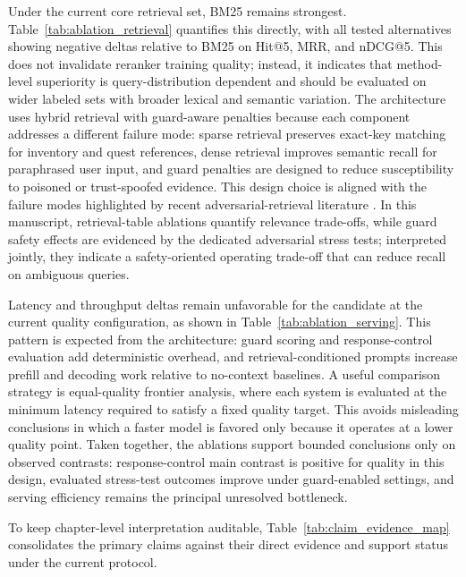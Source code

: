 ﻿\documentclass[a4paper,12pt]{article}
\begin{document}
Under the current core retrieval set, BM25 remains strongest. Table~\ref{tab:ablation_retrieval} quantifies this directly, with all tested alternatives showing negative deltas relative to BM25 on Hit@5, MRR, and nDCG@5. This does not invalidate reranker training quality; instead, it indicates that method-level superiority is query-distribution dependent and should be evaluated on wider labeled sets with broader lexical and semantic variation. The architecture uses hybrid retrieval with guard-aware penalties because each component addresses a different failure mode: sparse retrieval preserves exact-key matching for inventory and quest references, dense retrieval improves semantic recall for paraphrased user input, and guard penalties are designed to reduce susceptibility to poisoned or trust-spoofed evidence. This design choice is aligned with the failure modes highlighted by recent adversarial-retrieval literature \cite{Zou2025PoisonedRAG,Chaturvedi2025AIP}. In this manuscript, retrieval-table ablations quantify relevance trade-offs, while guard safety effects are evidenced by the dedicated adversarial stress tests; interpreted jointly, they indicate a safety-oriented operating trade-off that can reduce recall on ambiguous queries.

Latency and throughput deltas remain unfavorable for the candidate at the current quality configuration, as shown in Table~\ref{tab:ablation_serving}. This pattern is expected from the architecture: guard scoring and response-control evaluation add deterministic overhead, and retrieval-conditioned prompts increase prefill and decoding work relative to no-context baselines. A useful comparison strategy is equal-quality frontier analysis, where each system is evaluated at the minimum latency required to satisfy a fixed quality target. This avoids misleading conclusions in which a faster model is favored only because it operates at a lower quality point. Taken together, the ablations support bounded conclusions only on observed contrasts: response-control main contrast is positive for quality in this design, evaluated stress-test outcomes improve under guard-enabled settings, and serving efficiency remains the principal unresolved bottleneck.

To keep chapter-level interpretation auditable, Table~\ref{tab:claim_evidence_map} consolidates the primary claims against their direct evidence and support status under the current protocol.
\end{document}
